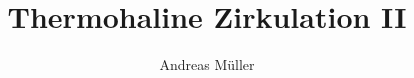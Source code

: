 %
%
%
\usepackage[utf8]{inputenc}
\usepackage[T1]{fontenc}
\usepackage{epic}
\usepackage{color}
\usepackage{array}
\usepackage{ifthen}
\usepackage{tikz}
\usetikzlibrary{shapes.geometric,math}
\beamertemplatenavigationsymbolsempty
\title[THC]{Thermohaline Zirkulation II}
\author{Andreas Müller}
\date[]{}


